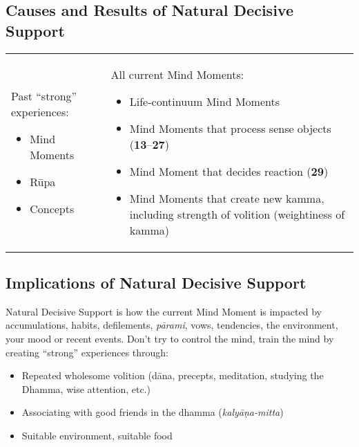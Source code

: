 \documentclass[a4 paper, 12pt]{article}
\begin{document}
\subsection*{Causes and Results of Natural Decisive Support}

\begin{tabular*}{\textwidth}{L{\tabcolsep} | L{\tabcolsep}}
\toprule
{} &  \\
\midrule

Past “strong” experiences:
\begin{itemize}
\item Mind Moments
\item Rūpa
\item Concepts
\end{itemize}

&
All current Mind Moments:
\begin{itemize}
\item Life-continuum Mind Moments
\item Mind Moments that process sense objects (\textbf{13}--\textbf{27})
\item Mind Moment that decides reaction (\textbf{29})
\item Mind Moments that create new kamma, including strength of volition (weightiness of kamma)\vspace*{-\baselineskip}
\end{itemize}\\
\bottomrule
\end{tabular*}

\subsection*{Implications of Natural Decisive Support}

Natural Decisive Support is how the current Mind Moment is impacted by accumulations, habits, defilements, \textit{pārami}, vows, tendencies, the environment, your mood or recent events. Don’t try to control the mind, train the mind by creating “strong” experiences through:

\begin{itemize}

\item Repeated wholesome volition (dāna, precepts, meditation, studying the Dhamma, wise attention, etc.)

\item Associating with good friends in the dhamma (\textit{kalyāṇa-mitta})

\item Suitable environment, suitable food

\end{itemize}
\end{document}
